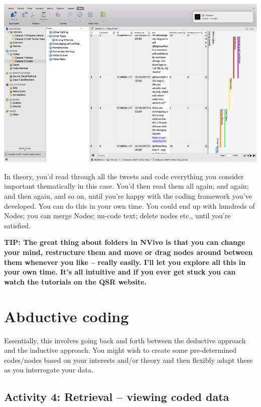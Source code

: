 \documentclass[]{book}
\theoremstyle{definition}
\theoremstyle{definition}
\theoremstyle{definition}
\theoremstyle{remark}
\begin{document}
\includegraphics{imgs/qual_50.png}

In theory, you'd read through all the tweets and code everything you
consider important thematically in this case. You'd then read them all
again; and again; and then again, and so on, until you're happy with the
coding framework you've developed. You can do this in your own time. You
could end up with hundreds of Nodes; you can merge Nodes; un-code text;
delete nodes etc., until you're satisfied.

\textbf{TIP: The great thing about folders in NVivo is that you can
change your mind, restructure them and move or drag nodes around between
them whenever you like -- really easily. I'll let you explore all this
in your own time. It's all intuitive and if you ever get stuck you can
watch the tutorials on the QSR website.}

\hypertarget{abductive-coding}{%
\section{Abductive coding}\label{abductive-coding}}

Essentially, this involves going back and forth between the deductive
approach and the inductive approach. You might wish to create some
pre-determined codes/nodes based on your interests and/or theory and
then flexibly adapt these as you interrogate your data.

\hypertarget{activity-4-retrieval-viewing-coded-data}{%
\subsection{Activity 4: Retrieval -- viewing coded
data}\label{activity-4-retrieval-viewing-coded-data}}
\end{document}
